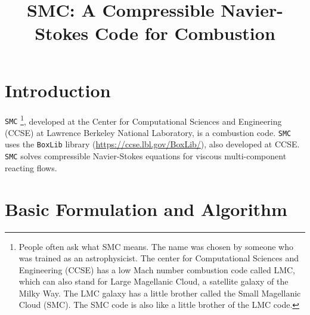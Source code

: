 \documentclass[11pt,letterpaper]{article}
\begin{document}
\title{SMC: A Compressible Navier-Stokes Code for Combustion}
\maketitle

\section{Introduction}

{\tt SMC} {\footnote{People often ask what SMC means.  The name was
    chosen by someone who was trained as an astrophysicist.  The
    center for Computational Sciences and Engineering (CCSE) has a low
    Mach number combustion code called LMC, which can also stand for
    Large Magellanic Cloud, a satellite galaxy of the Milky Way.  The
    LMC galaxy has a little brother called the Small Magellanic Cloud
    (SMC). The SMC code is also like a little brother of the LMC
    code.}}, developed at the Center for Computational Sciences and
Engineering (CCSE) at Lawrence Berkeley National Laboratory, is a
combustion code.  {\tt SMC} uses the {\tt BoxLib} library
(\url{https://ccse.lbl.gov/BoxLib/}), also developed at CCSE.  {\tt
  SMC} solves compressible Navier-Stokes equations for viscous
multi-component reacting flows.

\section{Basic Formulation and Algorithm}
\end{document}
